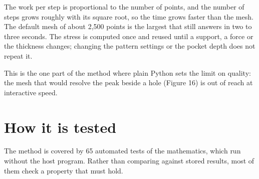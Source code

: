 \documentclass[11pt,a4paper]{article}
\begin{document}
The work per step is proportional to the number of points, and the number of steps grows roughly with its square root, so the time grows faster than the mesh. The default mesh of about 2,500 points is the largest that still answers in two to three seconds. The stress is computed once and reused until a support, a force or the thickness changes; changing the pattern settings or the pocket depth does not repeat it. 

This is the one part of the method where plain Python sets the limit on quality: the mesh that would resolve the peak beside a hole (Figure 16) is out of reach at interactive speed. 

\section{How it is tested}
 

The method is covered by 65 automated tests of the mathematics, which run without the host program. Rather than comparing against stored results, most of them check a property that must hold. 
\end{document}
